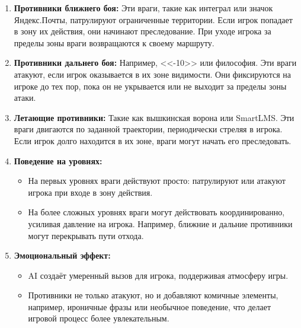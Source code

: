 \documentclass{article}
\begin{document}
\begin{enumerate}
    \item \textbf{Противники ближнего боя:}  
    Эти враги, такие как интеграл или значок Яндекс.Почты, патрулируют ограниченные территории. Если игрок попадает в зону их действия, они начинают преследование. При уходе игрока за пределы зоны враги возвращаются к своему маршруту.  

    \item \textbf{Противники дальнего боя:}  
    Например, <<-10>> или философия. Эти враги атакуют, если игрок оказывается в их зоне видимости. Они фиксируются на игроке до тех пор, пока он не укрывается или не выходит за пределы зоны атаки.  

    \item \textbf{Летающие противники:}  
    Такие как вышкинская ворона или SmartLMS. Эти враги двигаются по заданной траектории, периодически стреляя в игрока. Если игрок долго находится в их зоне, враги могут начать его преследовать.  

    \item \textbf{Поведение на уровнях:}  
    \begin{itemize}
        \item На первых уровнях враги действуют просто: патрулируют или атакуют игрока при входе в зону действия.  
        \item На более сложных уровнях враги могут действовать координированно, усиливая давление на игрока. Например, ближние и дальние противники могут перекрывать пути отхода.  
    \end{itemize}
    \item \textbf{Эмоциональный эффект:}  
    \begin{itemize}
        \item AI создаёт умеренный вызов для игрока, поддерживая атмосферу игры.  
        \item Противники не только атакуют, но и добавляют комичные элементы, например, ироничные фразы или необычное поведение, что делает игровой процесс более увлекательным.  
    \end{itemize}
\end{enumerate}
\end{document}
